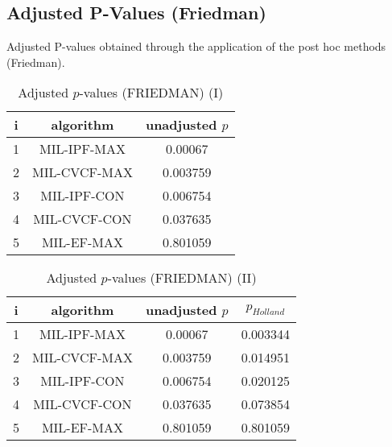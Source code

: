 \documentclass[a4paper,10pt]{article}
\begin{document}
\begin{landscape}
\newpage

\section{Adjusted P-Values (Friedman)}


Adjusted P-values obtained through the application of the post hoc methods (Friedman).

\begin{table}[!htp]
\centering\small
\begin{tabular}{ccc}
i&algorithm&unadjusted $p$\\
\hline1&MIL-IPF-MAX&0.00067\\2&MIL-CVCF-MAX&0.003759\\3&MIL-IPF-CON&0.006754\\4&MIL-CVCF-CON&0.037635\\5&MIL-EF-MAX&0.801059\\\hline
\end{tabular}
\caption{Adjusted $p$-values (FRIEDMAN) (I)}
\end{table}
\begin{table}[!htp]
\centering\small
\begin{tabular}{cccc}
i&algorithm&unadjusted $p$&$p_{Holland}$\\
\hline1&MIL-IPF-MAX&0.00067&0.003344\\2&MIL-CVCF-MAX&0.003759&0.014951\\3&MIL-IPF-CON&0.006754&0.020125\\4&MIL-CVCF-CON&0.037635&0.073854\\5&MIL-EF-MAX&0.801059&0.801059\\\hline
\end{tabular}
\caption{Adjusted $p$-values (FRIEDMAN) (II)}
\end{table}

\newpage
\end{landscape}
\end{document}
